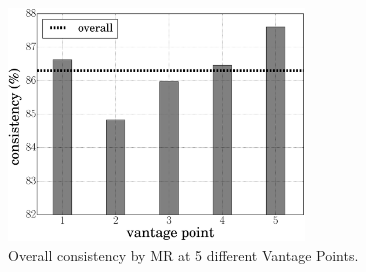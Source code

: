 \begin{figure}[!t]
	\centering
	\includegraphics[width=0.7\textwidth]{Pics/Percentage_consistency_5VP_MR.eps}
	\caption{Overall consistency by MR at 5 different Vantage Points.}
	\label{fig:Percentage_consistency_5VP_MR}
\end{figure}

